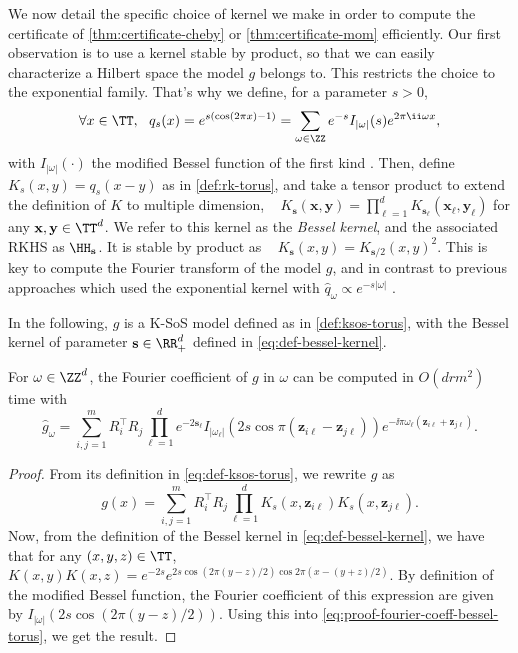 \documentclass{article}
\begin{document}
We now detail the specific choice of kernel we make in order to compute the certificate of \cref{thm:certificate-cheby} or \cref{thm:certificate-mom} efficiently. Our first observation is to use a kernel stable by product, so that we can easily characterize a Hilbert space the model $g$ belongs to. This restricts the choice to the exponential family. That's why we define, for a parameter $s > 0$,
\begin{equation}\label{eq:def-bessel-kernel}
  \forall x \in \TT, ~~ q_s(x) = e^{s (\cos (2\pi x) - 1)} = \sum_{\omega \in \ZZ} e^{-s} I_{|\omega|}(s) e^{2\pi \ii \omega x},
\end{equation}
with $I_{|\omega|}(\cdot)$ the modified Bessel function of the first kind \cite[p.181]{watsonTreatiseTheoryBessel1922}. Then, define $K_s(x, y) = q_s(x - y)$ as in \cref{def:rk-torus}, and take a tensor product to extend the definition of $K$ to multiple dimension, \ie ~ $K_{\mathbf{s}}(\mathbf{x}, \mathbf{y}) = \prod_{\ell = 1}^d K_{\mathbf{s}_\ell}(\mathbf{x}_\ell, \mathbf{y}_\ell)$ for any $\mathbf{x}, \mathbf{y} \in \TT^d$. We refer to this kernel as the \emph{Bessel kernel}, and the associated RKHS as $\HH_\mathbf{s}$. It is stable by product as ~ $K_\mathbf{s}(x, y) = K_{\mathbf{s}/2}(x, y)^2$. This is key to compute the Fourier transform of the model $g$, and in contrast to previous approaches which used the exponential kernel with $\hat{q}_\omega \propto e^{-s |\omega|}$ \cite{woodworthNonConvexOptimizationCertificates2022,bachExponentialConvergenceSumofsquares2023}.

In the following, $g$ is a K-SoS model defined as in \cref{def:ksos-torus}, with the Bessel kernel of parameter $\mathbf{s} \in \RR_+^d$ defined in \cref{eq:def-bessel-kernel}.

\begin{lemma}\label{lem:fourier-coeff-bessel-torus}
  For $\omega \in \ZZ^d$, the Fourier coefficient of $g$ in $\omega$ can be computed in $O(d r m^2)$ time with
  \begin{equation}
    \hat{g}_\omega = \sum_{i, j = 1}^m R_i^\top R_j \prod_{\ell = 1}^{d} e^{-2 \mathbf{s}_\ell} I_{|\omega_\ell|}(2s \cos \pi (\mathbf{z}_{i \ell} - \mathbf{z}_{j \ell})) e^{-\ii \pi \omega_\ell (\mathbf{z}_{i \ell} + \mathbf{z}_{j \ell})}.
  \end{equation}
\end{lemma}
\begin{proof}
  From its definition in \cref{eq:def-ksos-torus}, we rewrite $g$ as
  \begin{equation}\label{eq:proof-fourier-coeff-bessel-torus}
    g(x) = \sum_{i, j = 1}^m R_i^\top R_j \prod_{\ell = 1}^d K_s(x, \mathbf{z}_{i \ell}) K_s(x, \mathbf{z}_{j \ell}).
  \end{equation}
  Now, from the definition of the Bessel kernel in \cref{eq:def-bessel-kernel}, we have that for any $(x, y, z) \in \TT$, $K(x, y) K(x, z) = e^{-2s} e^{2s \cos (2\pi (y - z)/2) \cos 2\pi (x - (y+z)/2)}$. By definition of the modified Bessel function, the Fourier coefficient of this expression are given by $I_{|\omega|}(2s \cos (2\pi (y - z)/2))$. Using this into \cref{eq:proof-fourier-coeff-bessel-torus}, we get the result.
\end{proof}
\end{document}
